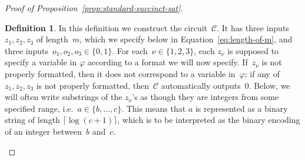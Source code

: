 \documentclass[11pt]{article}
\theoremstyle{definition}
\newtheorem{definition}[theorem]{Definition}
\newcommand{\circuit}{\mathcal{C}}
\begin{document}
\begin{proof}[Proof of Proposition~\ref{prop:standard-succinct-sat}]
\begin{definition}
  In this definition we construct the circuit~$\circuit$.
  It has three inputs~$z_1, z_2, z_3$ of length~$m$, which we specify below in
  Equation~\eqref{eq:length-of-m}, and three inputs~$o_1, o_2, o_3 \in \{0,
  1\}$.
	For each~$\nu \in \{1, 2, 3\}$, each $z_\nu$ is supposed to specify a variable
  in $\varphi$ according to a format we will now specify.
	If~$z_\nu$ is not properly formatted, then it does not correspond to a
  variable in~$\varphi$; if any of~$z_1, z_2, z_3$ is not properly formatted,
  then~$\circuit$ automatically outputs~$0$.
	Below, we will often write substrings of the $z_\nu$'s as though they are
  integers from some specified range, i.e.\ $a \in \{b, \ldots, c\}$.
	This means that $a$ is represented as a binary string of length $\lceil
  \log(c+1) \rceil$, which is to be interpreted as the binary encoding of an
  integer between~$b$ and~$c$.
	

\end{definition}
\end{proof}
\end{document}
